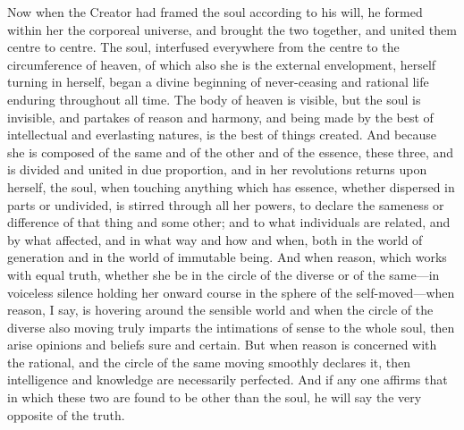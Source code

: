 \documentclass[11pt,letter]{article}
\begin{document}
\par  Now when the Creator had framed the soul according to his will, he formed within her the corporeal universe, and brought the two together, and united them centre to centre. The soul, interfused everywhere from the centre to the circumference of heaven, of which also she is the external envelopment, herself turning in herself, began a divine beginning of never-ceasing and rational life enduring throughout all time. The body of heaven is visible, but the soul is invisible, and partakes of reason and harmony, and being made by the best of intellectual and everlasting natures, is the best of things created. And because she is composed of the same and of the other and of the essence, these three, and is divided and united in due proportion, and in her revolutions returns upon herself, the soul, when touching anything which has essence, whether dispersed in parts or undivided, is stirred through all her powers, to declare the sameness or difference of that thing and some other; and to what individuals are related, and by what affected, and in what way and how and when, both in the world of generation and in the world of immutable being. And when reason, which works with equal truth, whether she be in the circle of the diverse or of the same—in voiceless silence holding her onward course in the sphere of the self-moved—when reason, I say, is hovering around the sensible world and when the circle of the diverse also moving truly imparts the intimations of sense to the whole soul, then arise opinions and beliefs sure and certain. But when reason is concerned with the rational, and the circle of the same moving smoothly declares it, then intelligence and knowledge are necessarily perfected. And if any one affirms that in which these two are found to be other than the soul, he will say the very opposite of the truth.
\end{document}
